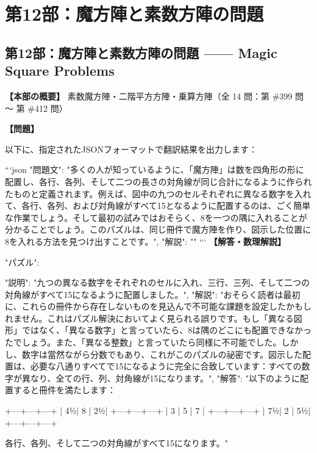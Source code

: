 \documentclass[10pt,a4paper,oneside,openany]{ltjsbook}
\begin{document}
\part{第12部：魔方陣と素数方陣の問題}
\chapter*{第12部：魔方陣と素数方陣の問題 —— Magic Square Problems}

\textbf{【本部の概要】} 素数魔方陣・二階平方方陣・乗算方陣（全 14 問：第 \#399 問 〜 第 \#412 問）

\vspace{1em}

\begin{tcolorbox}[colback=softblue,colframe=primaryblue,title=\textbf{第 399 問：THE TROUBLESOME EIGHT.},arc=2mm,boxrule=1pt,breakable]
\textbf{【問題】}\par\vspace{0.3em}
以下に、指定されたJSONフォーマットで翻訳結果を出力します：

```json
{
  "問題文": "多くの人が知っているように、「魔方陣」は数を四角形の形に配置し、各行、各列、そして二つの長さの対角線が同じ合計になるように作られたものと定義されます。例えば、図中の九つのセルそれぞれに異なる数字を入れて、各行、各列、および対角線がすべて15となるように配置するのは、ごく簡単な作業でしょう。そして最初の試みではおそらく、8を一つの隅に入れることが分かることでしょう。このパズルは、同じ冊件で魔方陣を作り、図示した位置に8を入れる方法を見つけ出すことです。",
  "解説": ""
}
```
\tcblower
\textbf{【解答・数理解説】}\par\vspace{0.3em}
{
    "パズル": {
        "説明": "九つの異なる数字をそれぞれのセルに入れ、三行、三列、そして二つの対角線がすべて15になるように配置しました。",
        "解説": "おそらく読者は最初に、これらの冊件から存在しないものを見込んで不可能な課題を設定したかもしれません。これはパズル解決においてよく見られる誤りです。もし「異なる図形」ではなく、「異なる数字」と言っていたら、8は隅のどこにも配置できなかったでしょう。また、「異なる整数」と言っていたら同様に不可能でした。しかし、数字は當然ながら分数でもあり、これがこのパズルの祕密です。図示した配置は、必要な八通りすべてで15になるように完全に合致しています：すべての数字が異なり、全ての行、列、対角線が15になります。",
        "解答": "以下のように配置すると冊件を満たします：

    +---+---+---+
    | 4½| 8 | 2½|
    +---+---+---+
    | 3 | 5 | 7 |
    +---+---+---+
    | 7½| 2 | 5½|
    +---+---+---+

各行、各列、そして二つの対角線がすべて15になります。"
    }
}
\end{tcolorbox}
\end{document}
